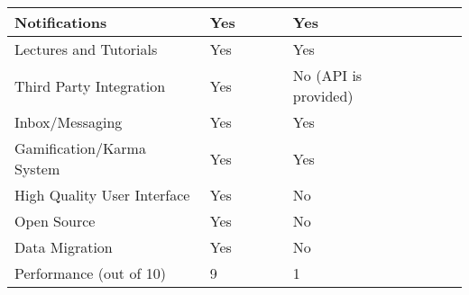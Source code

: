 \begin{table}[ht]
{\begin{tabular}{llllllll}
    \multicolumn{1}{|l|}{Notifications}               & \multicolumn{1}{l|}{Yes} & \multicolumn{1}{l|}{} & \multicolumn{1}{l|}{} & \multicolumn{1}{l|}{} & \multicolumn{1}{l|}{Yes}                       & \multicolumn{1}{l|}{} & \multicolumn{1}{l|}{} \\ \hline
    \multicolumn{1}{|l|}{Lectures and Tutorials}      & \multicolumn{1}{l|}{Yes} & \multicolumn{1}{l|}{} & \multicolumn{1}{l|}{} & \multicolumn{1}{l|}{} & \multicolumn{1}{l|}{Yes}                       & \multicolumn{1}{l|}{} & \multicolumn{1}{l|}{} \\ \hline
    \multicolumn{1}{|l|}{Third Party Integration}     & \multicolumn{1}{l|}{Yes} & \multicolumn{1}{l|}{} & \multicolumn{1}{l|}{} & \multicolumn{1}{l|}{} & \multicolumn{1}{l|}{No (API is provided)}      & \multicolumn{1}{l|}{} & \multicolumn{1}{l|}{} \\ \hline
    \multicolumn{1}{|l|}{Inbox/Messaging}             & \multicolumn{1}{l|}{Yes} & \multicolumn{1}{l|}{} & \multicolumn{1}{l|}{} & \multicolumn{1}{l|}{} & \multicolumn{1}{l|}{Yes}                       & \multicolumn{1}{l|}{} & \multicolumn{1}{l|}{} \\ \hline
    \multicolumn{1}{|l|}{Gamification/Karma System}   & \multicolumn{1}{l|}{Yes} & \multicolumn{1}{l|}{} & \multicolumn{1}{l|}{} & \multicolumn{1}{l|}{} & \multicolumn{1}{l|}{Yes}                       & \multicolumn{1}{l|}{} & \multicolumn{1}{l|}{} \\ \hline
    \multicolumn{1}{|l|}{High Quality User Interface} & \multicolumn{1}{l|}{Yes} & \multicolumn{1}{l|}{} & \multicolumn{1}{l|}{} & \multicolumn{1}{l|}{} & \multicolumn{1}{l|}{No}                        & \multicolumn{1}{l|}{} & \multicolumn{1}{l|}{} \\ \hline
    \multicolumn{1}{|l|}{Open Source}                 & \multicolumn{1}{l|}{Yes} & \multicolumn{1}{l|}{} & \multicolumn{1}{l|}{} & \multicolumn{1}{l|}{} & \multicolumn{1}{l|}{No}                        & \multicolumn{1}{l|}{} & \multicolumn{1}{l|}{} \\ \hline
    \multicolumn{1}{|l|}{Data Migration}              & \multicolumn{1}{l|}{Yes} & \multicolumn{1}{l|}{} & \multicolumn{1}{l|}{} & \multicolumn{1}{l|}{} & \multicolumn{1}{l|}{No}                        & \multicolumn{1}{l|}{} & \multicolumn{1}{l|}{} \\ \hline
    Performance (out of 10)                           & 9                      &                       &                       &                       & 1                                              &                       &                       \\ \hline
    \end{tabular}}
    \end{table}


